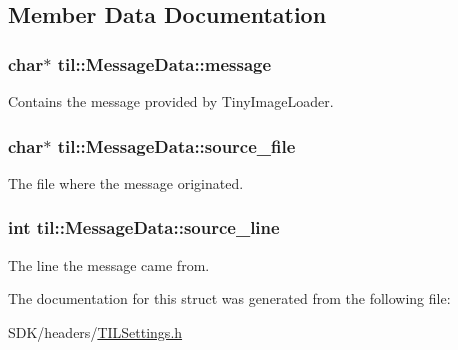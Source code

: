\subsection{Member Data Documentation}
\hypertarget{structtil_1_1_message_data_a509ca54f8bbc534d0220d3e7b1637a8d}{
\subsubsection[{message}]{\setlength{\rightskip}{0pt plus 5cm}char$\ast$ {\bf til::MessageData::message}}}
\label{structtil_1_1_message_data_a509ca54f8bbc534d0220d3e7b1637a8d}
Contains the message provided by TinyImageLoader. \hypertarget{structtil_1_1_message_data_a0e06be68ecffce75b5920a24d367bad7}{
\subsubsection[{source\_\-file}]{\setlength{\rightskip}{0pt plus 5cm}char$\ast$ {\bf til::MessageData::source\_\-file}}}
\label{structtil_1_1_message_data_a0e06be68ecffce75b5920a24d367bad7}
The file where the message originated. \hypertarget{structtil_1_1_message_data_a431af7e6298fbf1d6a0cf4518d67d153}{
\subsubsection[{source\_\-line}]{\setlength{\rightskip}{0pt plus 5cm}int {\bf til::MessageData::source\_\-line}}}
\label{structtil_1_1_message_data_a431af7e6298fbf1d6a0cf4518d67d153}
The line the message came from. 

The documentation for this struct was generated from the following file:\begin{DoxyCompactItemize}
\item 
SDK/headers/\hyperlink{_t_i_l_settings_8h}{TILSettings.h}\end{DoxyCompactItemize}
